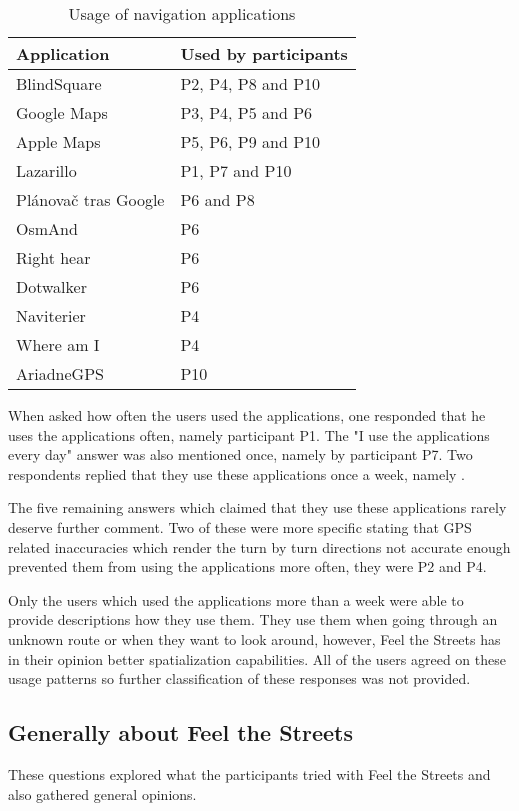 \documentclass[nolof,digital]{fithesis3}
\begin{document}
\begin{table}
\caption{Usage of navigation applications}
\begin{tabularx}{\textwidth}{|X|X|}
Application & Used by participants \\
\hline
BlindSquare \parencite{blindsquare} & P2, P4, P8 and P10 \\
Google Maps \parencite{googlemaps} & P3, P4, P5 and P6 \\
Apple Maps \parencite{applemaps} & P5, P6, P9 and P10 \\
Lazarillo \parencite{lazarillo} & P1, P7 and P10 \\
Plánovač tras Google \parencite{ptg} & P6 and P8 \\
OsmAnd \parencite{osmand} & P6 \\
Right hear \parencite{righthear} & P6 \\
Dotwalker \parencite{dotwalker} & P6 \\
Naviterier \parencite{naviterier} & P4 \\
Where am I \parencite{whereami} & P4 \\
AriadneGPS \parencite{ariadnegps} & P10 \\
\end{tabularx}
\end{table}

When asked how often the users used the applications, one responded that he uses the applications often, namely participant P1. The "I use the applications every day" answer was also mentioned once, namely by participant P7. Two respondents replied that they use these applications once a week, namely .

The five remaining answers which claimed that they use these applications rarely deserve further comment. Two of these were more specific stating that GPS related inaccuracies which render the turn by turn directions not accurate enough prevented them from using the applications more often, they were P2 and P4.

Only the users which used the applications more than a week were able to provide descriptions how they use them. They use them when going through an unknown route or when they want to look around, however, Feel the Streets has in their opinion better spatialization capabilities. All of the users agreed on these usage patterns so further classification of these responses was not provided.
\subsection{Generally about Feel the Streets}
These questions explored what the participants tried with Feel the Streets and also gathered general opinions.
\end{document}
